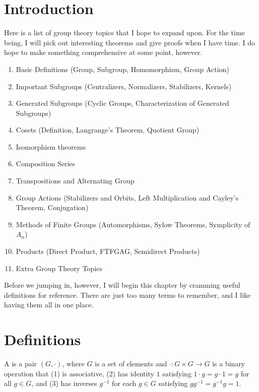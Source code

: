 \documentclass[class=report, crop=false]{standalone}
\begin{document}
\section{Introduction}

Here is a list of group theory topics that I hope to expand upon. For the time being, I will pick out interesting theorems and give proofs when I have time. I do hope to make something comprehensive at some point, however.
\begin{enumerate}
    \item Basic Definitions (Group, Subgroup, Homomorphism, Group Action)
    \item Important Subgroups (Centralizers, Normalizers, Stabilizers, Kernels)
    \item Generated Subgroups (Cyclic Groups, Characterization of Generated Subgroups)
    \item Cosets (Definition, Langrange's Theorem, Quotient Group)
    \item Isomorphism theorems
    \item Composition Series
    \item Transpositions and Alternating Group
    \item Group Actions (Stabilizers and Orbits, Left Multiplication and Cayley's Theorem, Conjugation)
    \item Methods of Finite Groups (Automorphisms, Sylow Theorems, Symplicity of $A_n$)
    \item Products (Direct Product, FTFGAG, Semidirect Products)
    \item Extra Group Theory Topics
\end{enumerate}

Before we jumping in, however, I will begin this chapter by cramming useful definitions for reference. There are just too many terms to remember, and I like having them all in one place.


\newpage

\section{Definitions}


\begin{definition}
    A  is a pair $(G,\cdot)$, where $G$ is a set of elements and $\cdot: G\times G\to G$ is a binary operation that (1) is associative, (2) has identity $1$ satisfying $1\cdot g = g\cdot 1 = g$ for all $g\in G$, and (3) has inverses $g^{-1}$ for each $g\in G$ satisfying $gg^{-1}=g^{-1}g=1$.
\end{definition}
\end{document}
